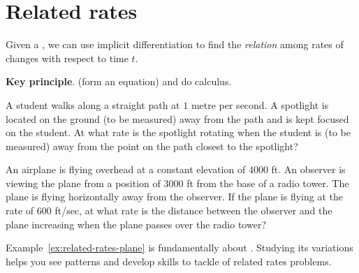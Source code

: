\documentclass[../main.tex]{subfiles}
\begin{document}
 \section{Related rates}
Given a , we can use implicit differentiation  to find the \emph{relation} among rates of changes with respect to time \(t\).

\begin{mdframed}[style=simple-compact]
  \textbf{Key principle}.  (form an equation) and do calculus.
\end{mdframed}

\begin{example} \label{ex:related-rates-intro}
  A student walks along a straight path at \(1\) metre per second.  A spotlight is located on the ground (to be measured) \underline{\hspace{1in}} away from the path and is kept focused on the student. At what rate is the spotlight rotating when the student is (to be measured) \underline{\hspace{1in}} away from the point on the path closest to the spotlight?
\end{example}

\clearpage

\begin{example} \label{ex:related-rates-plane}
  An airplane is flying overhead at a constant elevation of \(4000\) ft. An observer is viewing the plane from a position of \(3000\) ft from the base of a radio tower. The plane is flying horizontally away from the observer. If the plane is flying at the rate of \(600\) ft/sec, at what rate is the distance between the observer and the plane increasing when the plane passes over the radio tower?

\end{example}
\clearpage

Example~\ref{ex:related-rates-plane} is fundamentally about \underline{\hspace{4.4in}}.  Studying its variations helps you see patterns and develop skills to tackle  of related rates problems.
\end{document}
